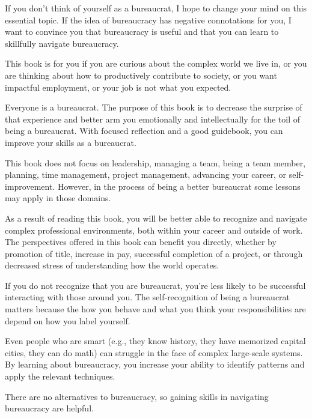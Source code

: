 

If you don't think of yourself as a bureaucrat, I hope to change your mind on this essential topic. 
 If the idea of bureaucracy has negative connotations for you, I want to convince you that bureaucracy is useful and that you can learn to skillfully navigate bureaucracy.


This book is for you if you are curious about the complex world we live in, or you are thinking about how to productively contribute to society, or you want impactful employment, or your job is not what you expected. 


Everyone is a bureaucrat. The purpose of this book is to decrease the surprise of that experience and better arm you emotionally and intellectually for the toil of being a bureaucrat. With focused reflection and a good guidebook, you can improve your skills as a bureaucrat. 

This book does not focus on leadership, managing a team, being a team member, planning, time management, project management, advancing your career, or self-improvement. However, in the process of being a better bureaucrat some lessons may apply in those domains.

As a result of reading this book, you will be better able to recognize and navigate complex professional environments, both within your career and outside of work. The perspectives offered in this book can benefit you directly, whether by promotion of title, increase in pay, successful completion of a project, or through decreased stress of understanding how the world operates.

If you do not recognize that you are bureaucrat, you're less likely to be successful interacting with those around you. The self-recognition of being a bureaucrat matters because the how you behave and what you think your responsibilities are depend on how you label yourself.

Even people who are smart (e.g., they know history, they have memorized capital cities, they can do math) can struggle in the face of complex large-scale systems. By learning about bureaucracy, you increase your ability to identify patterns and apply the relevant techniques.

There are no alternatives to bureaucracy, so gaining skills in navigating bureaucracy are helpful. 

